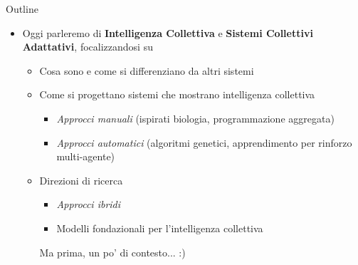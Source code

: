 \documentclass[presentation, 10pt,aspectratio=169]{beamer}\mode<presentation>{\usetheme{AMSBolognaFC}}
\begin{document}
\begin{frame}{Outline}
	\begin{itemize}
		\item Oggi parleremo di \alert{\textbf{Intelligenza Collettiva}} e \alert{\textbf{Sistemi Collettivi Adattativi}}, focalizzandosi su
		\begin{itemize}
			\item Cosa sono e come si differenziano da altri sistemi
			\item Come si progettano sistemi che mostrano intelligenza collettiva
			\begin{itemize}
				\item \emph{Approcci manuali} (ispirati biologia, programmazione aggregata)
				\item \emph{Approcci automatici} (algoritmi genetici, apprendimento per rinforzo multi-agente)
			\end{itemize}
			\item Direzioni di ricerca
			\begin{itemize}
				\item \emph{Approcci ibridi}
				\item Modelli fondazionali per l'intelligenza collettiva
			\end{itemize}
			Ma prima, un po' di contesto... :)
		\end{itemize}
	\end{itemize}
\end{frame}
\end{document}
